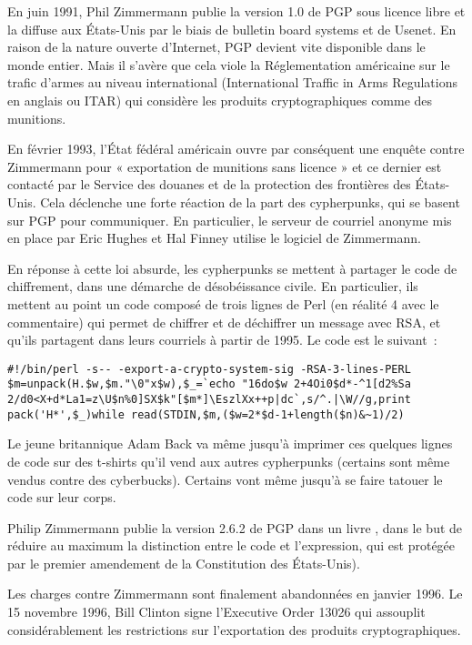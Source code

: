 En juin 1991, Phil Zimmermann publie la version 1.0 de PGP sous licence libre et la diffuse aux États-Unis par le biais de bulletin board systems et de Usenet. En raison de la nature ouverte d'Internet, PGP devient vite disponible dans le monde entier. Mais il s'avère que cela viole la Réglementation américaine sur le trafic d'armes au niveau international (International Traffic in Arms Regulations en anglais ou ITAR) qui considère les produits cryptographiques comme des munitions.

En février 1993, l'État fédéral américain ouvre par conséquent une enquête contre Zimmermann pour « exportation de munitions sans licence » et ce dernier est contacté par le Service des douanes et de la protection des frontières des États-Unis. Cela déclenche une forte réaction de la part des cypherpunks, qui se basent sur PGP pour communiquer. En particulier, le serveur de courriel anonyme mis en place par Eric Hughes et Hal Finney utilise le logiciel de Zimmermann.

En réponse à cette loi absurde, les cypherpunks se mettent à partager le code de chiffrement, dans une démarche de désobéissance civile. En particulier, ils mettent au point un code composé de trois lignes de Perl (en réalité 4 avec le commentaire) qui permet de chiffrer et de déchiffrer un message avec RSA, et qu'ils partagent dans leurs courriels à partir de 1995. Le code est le suivant~:

\begin{Verbatim}[fontsize=\small]
#!/bin/perl -s-- -export-a-crypto-system-sig -RSA-3-lines-PERL
$m=unpack(H.$w,$m."\0"x$w),$_=`echo "16do$w 2+4Oi0$d*-^1[d2%Sa
2/d0<X+d*La1=z\U$n%0]SX$k"[$m*]\EszlXx++p|dc`,s/^.|\W//g,print
pack('H*',$_)while read(STDIN,$m,($w=2*$d-1+length($n)&~1)/2)
\end{Verbatim}

Le jeune britannique Adam Back va même jusqu'à imprimer ces quelques lignes de code sur des t-shirts qu'il vend aux autres cypherpunks (certains sont même vendus contre des cyberbucks). Certains vont même jusqu'à se faire tatouer le code sur leur corps.

Philip Zimmermann publie la version 2.6.2 de PGP dans un livre , dans le but de réduire au maximum la distinction entre le code et l'expression, qui est protégée par le premier amendement de la Constitution des États-Unis).

Les charges contre Zimmermann sont finalement abandonnées en janvier 1996. Le 15 novembre 1996, Bill Clinton signe l'Executive Order 13026 qui assouplit considérablement les restrictions sur l'exportation des produits cryptographiques.

